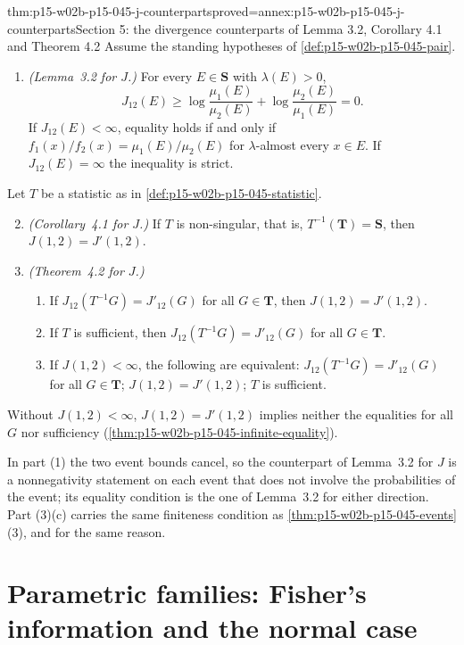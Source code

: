 \begin{hbtheorem}{thm:p15-w02b-p15-045-j-counterparts}{proved=annex:p15-w02b-p15-045-j-counterparts}{Section 5: the divergence counterparts of Lemma 3.2, Corollary 4.1 and Theorem 4.2}
Assume the standing hypotheses of \cref{def:p15-w02b-p15-045-pair}.
\begin{enumerate}
\item \emph{(Lemma~3.2 for \(J\).)} For every \(E\in\mathbf S\) with
\(\lambda(E)>0\),
\[
  J_{12}(E)\geq\log\frac{\mu_1(E)}{\mu_2(E)}+\log\frac{\mu_2(E)}{\mu_1(E)}=0 .
\]
If \(J_{12}(E)<\infty\), equality holds if and only if
\(f_1(x)/f_2(x)=\mu_1(E)/\mu_2(E)\) for \(\lambda\)-almost every
\(x\in E\). If \(J_{12}(E)=\infty\) the inequality is strict.
\end{enumerate}
Let \(T\) be a statistic as in \cref{def:p15-w02b-p15-045-statistic}.
\begin{enumerate}\setcounter{enumi}{1}
\item \emph{(Corollary~4.1 for \(J\).)} If \(T\) is non-singular, that
is, \(T^{-1}(\mathbf T)=\mathbf S\), then \(J(1,2)=J'(1,2)\).
\item \emph{(Theorem~4.2 for \(J\).)}
\begin{enumerate}
\item If \(J_{12}(T^{-1}G)=J'_{12}(G)\) for all \(G\in\mathbf T\), then
\(J(1,2)=J'(1,2)\).
\item If \(T\) is sufficient, then \(J_{12}(T^{-1}G)=J'_{12}(G)\) for
all \(G\in\mathbf T\).
\item If \(J(1,2)<\infty\), the following are equivalent:
\(J_{12}(T^{-1}G)=J'_{12}(G)\) for all \(G\in\mathbf T\);
\(J(1,2)=J'(1,2)\); \(T\) is sufficient.
\end{enumerate}
\end{enumerate}
Without \(J(1,2)<\infty\), \(J(1,2)=J'(1,2)\) implies neither the
equalities for all \(G\) nor sufficiency
(\cref{thm:p15-w02b-p15-045-infinite-equality}).
\end{hbtheorem}

In part (1) the two event bounds cancel, so the counterpart of
Lemma~3.2 for \(J\) is a nonnegativity statement on each event that does
not involve the probabilities of the event; its equality condition is the
one of Lemma~3.2 for either direction. Part (3)(c) carries the same
finiteness condition as \cref{thm:p15-w02b-p15-045-events}(3), and for
the same reason.

\section{Parametric families: Fisher's information and the normal case}
\label{sec:p15-w02b-p15-045-parametric}

